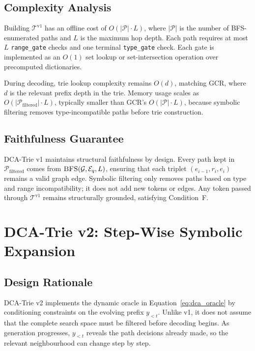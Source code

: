 \subsection{Complexity Analysis}

Building $\mathcal{T}^{\text{v1}}$ has an offline cost of $O(|\mathcal{P}| \cdot L)$, where $|\mathcal{P}|$ is the number of BFS-enumerated paths and $L$ is the maximum hop depth. Each path requires at most $L$ \texttt{range\_gate} checks and one terminal \texttt{type\_gate} check. Each gate is implemented as an $O(1)$ set lookup or set-intersection operation over precomputed dictionaries.

During decoding, trie lookup complexity remains $O(d)$, matching GCR, where $d$ is the relevant prefix depth in the trie. Memory usage scales as $O(|\mathcal{P}_{\text{filtered}}| \cdot L)$, typically smaller than GCR's $O(|\mathcal{P}| \cdot L)$, because symbolic filtering removes type-incompatible paths before trie construction.

\subsection{Faithfulness Guarantee}

DCA-Trie v1 maintains structural faithfulness by design. Every path kept in $\mathcal{P}_{\text{filtered}}$ comes from $\textsc{BFS}(\mathcal{G}, \mathcal{E}_q, L)$, ensuring that each triplet $(e_{i-1}, r_i, e_i)$ remains a valid graph edge. Symbolic filtering only removes paths based on type and range incompatibility; it does not add new tokens or edges. Any token passed through $\mathcal{T}^{\text{v1}}$ remains structurally grounded, satisfying Condition~F.

\section{DCA-Trie v2: Step-Wise Symbolic Expansion}
\label{sec:ch3v2}

\subsection{Design Rationale}

DCA-Trie v2 implements the dynamic oracle in Equation~\eqref{eq:dca_oracle} by conditioning constraints on the evolving prefix $y_{<t}$. Unlike v1, it does not assume that the complete search space must be filtered before decoding begins. As generation progresses, $y_{<t}$ reveals the path decisions already made, so the relevant neighbourhood can change step by step.

